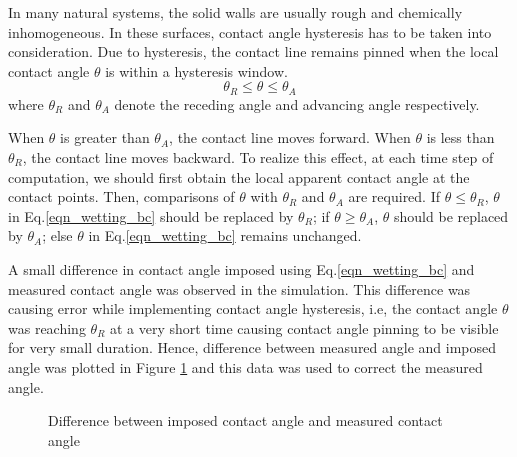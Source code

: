 \documentclass[11pt]{article}
\begin{document}
In many natural systems, the solid walls are usually rough and chemically inhomogeneous. In these surfaces, contact angle hysteresis has to be taken into consideration. Due to hysteresis, the contact line remains pinned when the local contact angle $\theta$ is within a hysteresis window.
\begin{equation}
\theta_{R} \leq \theta \leq \theta_{A} 
\end{equation}
where $\theta_{R}$ and $\theta_{A}$ denote the receding angle and advancing angle respectively. 
\par 
When $\theta$ is greater than $\theta_{A}$, the contact line moves forward. When $\theta$ is less than $\theta_{R}$, the contact line moves backward. To realize this effect, at each time step of computation, we should first obtain the local apparent contact angle at the contact points. Then, comparisons of $\theta$ with $\theta_{R}$ and $\theta_{A}$ are required. If $\theta \leq \theta_{R}$, $\theta$ in Eq.\ref{eqn_wetting_bc} should be replaced by $\theta_{R}$; if $\theta \geq \theta_{A}$, $\theta$ should be replaced by $\theta_{A}$; else $\theta$ in Eq.\ref{eqn_wetting_bc} remains unchanged.
\par
A small difference in contact angle imposed using Eq.\ref{eqn_wetting_bc} and measured contact angle was observed in the simulation. This difference was causing error while implementing contact angle hysteresis, i.e, the contact angle $\theta$ was reaching $\theta_{R}$ at a very short time causing contact angle pinning to be visible for very small duration. Hence, difference between measured angle and imposed angle was plotted in Figure \ref{fig:angle_correction} and this data was used to correct the measured angle. 
\begin{figure}[h!]
	\begin{center}
		\caption{Difference between imposed contact angle and measured contact angle}
		\label{fig:angle_correction}
	\end{center}
\end{figure}
\end{document}
